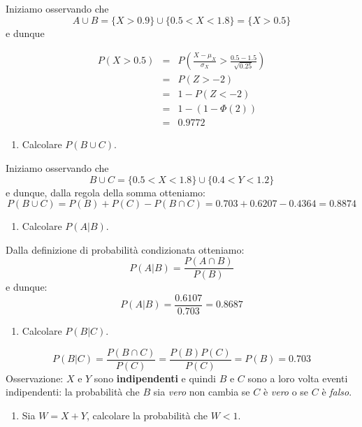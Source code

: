\documentclass[
  11pt,
]{book}
\providecommand{\tightlist}{%
  \setlength{\itemsep}{0pt}\setlength{\parskip}{0pt}}
\theoremstyle{mytheoremstyle}
\theoremstyle{mydefstyle}
\begin{document}
Iniziamo osservando che
\[A\cup B=\{X>0.9\}\cup\{0.5<X<1.8\}=\{X > 0.5\}\]
e dunque

\begin{eqnarray*}
      P( X   >   0.5 ) 
        &=& P\left(  \frac { X  -  \mu_X }{ \sigma_X }  >  \frac { 0.5  -  1.5 }{\sqrt{ 0.25 }} \right)  \\
                 &=& P\left(  Z   >   -2 \right) \\    &=& 1-P(Z< -2 )\\ 
                 &=&  1-(1-\Phi( 2 )) \\ &=&  0.9772 
      \end{eqnarray*}

\begin{enumerate}
\def\labelenumi{\arabic{enumi}.}
\setcounter{enumi}{8}
\tightlist
\item
  Calcolare \(P(B\cup C)\).
\end{enumerate}

Iniziamo osservando che
\[B\cup C=\{0.5<X<1.8\}\cup\{0.4<Y<1.2\}\]
e dunque, dalla regola della somma otteniamo:
\[P(B\cup C)=P(B)+P(C)-P(B\cap C)=0.703+0.6207-0.4364=0.8874\]

\begin{enumerate}
\def\labelenumi{\arabic{enumi}.}
\setcounter{enumi}{9}
\tightlist
\item
  Calcolare \(P(A|B)\).
\end{enumerate}

Dalla definizione di probabilità condizionata otteniamo:
\[P(A|B)=\frac{P(A\cap B)}{P(B)}\]
e dunque:
\[P(A|B)=\frac{0.6107}{0.703}=0.8687\]

\begin{enumerate}
\def\labelenumi{\arabic{enumi}.}
\setcounter{enumi}{10}
\tightlist
\item
  Calcolare \(P(B|C)\).
\end{enumerate}

\[P(B|C)=\frac{P(B\cap C)}{P(C)}=\frac{P(B)P(C)}{P(C)}=P(B)=0.703\]
Osservazione: \(X\) e \(Y\) sono \textbf{indipendenti} e quindi \(B\) e \(C\) sono a loro volta eventi indipendenti: la probabilità che \(B\) sia \emph{vero} non cambia se \(C\) è \emph{vero} o se \(C\) è \emph{falso}.

\begin{enumerate}
\def\labelenumi{\arabic{enumi}.}
\setcounter{enumi}{11}
\tightlist
\item
  Sia \(W=X+Y\), calcolare la probabilità che \(W<1\).
\end{enumerate}
\end{document}
